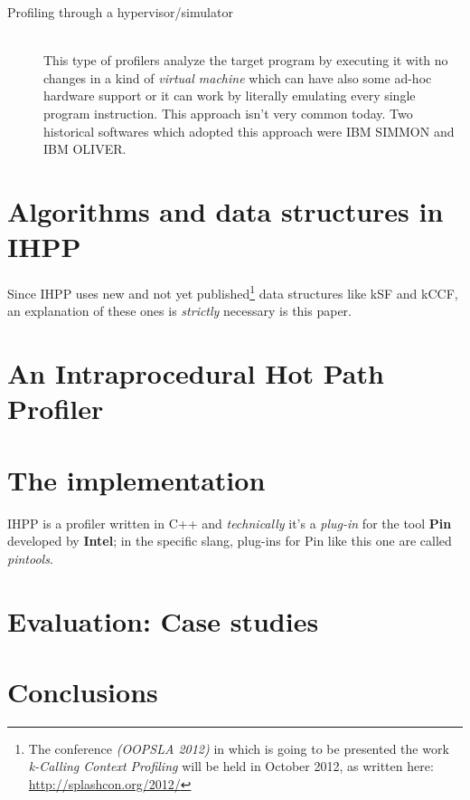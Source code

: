 \documentclass[a4paper,11pt]{report}
\begin{document}
\begin{description}
\begin{description}
\end{description} 

\item[Profiling through a hypervisor/simulator] \hfill \\
This type of profilers analyze the target program by executing it with no changes in a kind of \emph{virtual machine} which can have also some ad-hoc hardware support or it can work by literally emulating every single program instruction. This approach isn't very common today. Two historical softwares which adopted this approach were IBM SIMMON and IBM OLIVER.

\end{description}

\chapter{Algorithms and data structures in IHPP}
Since IHPP uses new and not yet published\footnote{The conference \emph{(OOPSLA 2012)} in which is going to be presented the work \emph{k-Calling Context Profiling} will be held in October 2012, as written here: \url{http://splashcon.org/2012/}} data structures like kSF and kCCF, an explanation of these ones is \emph{strictly} necessary is this paper.


\chapter{An Intraprocedural Hot Path Profiler}

\chapter{The implementation}

IHPP is a profiler written in C++ and \emph{technically} it's a \emph{plug-in} for the tool \textbf{Pin} developed by \textbf{Intel}; in the specific slang, plug-ins for Pin like this one are called \emph{pintools}.

\chapter{Evaluation: Case studies}


\chapter{Conclusions}
\end{document}
